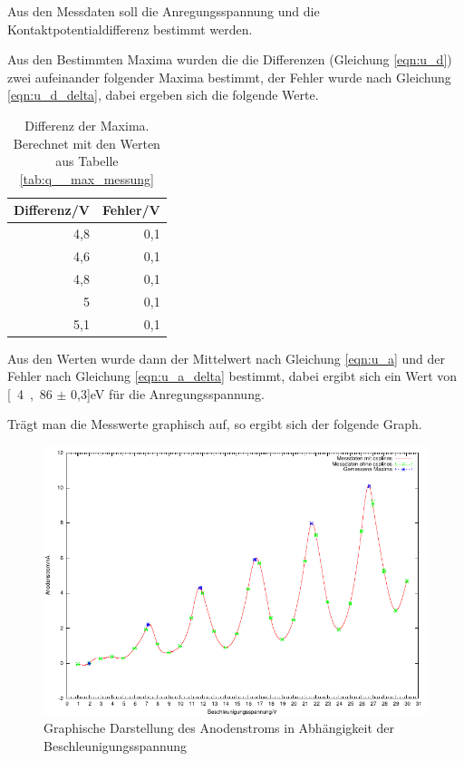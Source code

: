 \documentclass[12pt,a4paper]{article}
\begin{document}
Aus den Messdaten soll die Anregungsspannung und die Kontaktpotentialdifferenz bestimmt werden.

Aus den Bestimmten Maxima wurden die die Differenzen (Gleichung \ref{eqn:u_d}) zwei aufeinander folgender Maxima bestimmt, der Fehler wurde nach Gleichung \ref{eqn:u_d_delta}, dabei ergeben sich die folgende Werte.

\begin{table}[H]
\caption{Differenz der Maxima. Berechnet mit den Werten aus Tabelle \ref{tab:q__max_messung} }
\begin{center}
\begin{tabular}{|r|r|}
\hline
\multicolumn{1}{|l|}{Differenz/V} & \multicolumn{1}{l|}{Fehler/V} \\ \hline
4,8 & 0,1 \\ \hline
4,6 & 0,1 \\ \hline
4,8 & 0,1 \\ \hline
5 & 0,1 \\ \hline
5,1 & 0,1 \\ \hline
\end{tabular}
\end{center}
\label{tab:q__diff}
\end{table}

Aus den Werten wurde dann der Mittelwert nach Gleichung \ref{eqn:u_a} und der Fehler nach Gleichung \ref{eqn:u_a_delta} bestimmt, dabei ergibt sich ein Wert von \unit[4,86 $\pm$ 0,3]{eV} für die Anregungsspannung.

Trägt man die Messwerte graphisch auf, so ergibt sich der folgende Graph.

\begin{figure}[H]
	\centering
	\includegraphics[scale= 1.5]{q_t.pdf}
	\caption{Graphische Darstellung des Anodenstroms in Abhängigkeit der Beschleunigungsspannung}
\end{figure}
\end{document}
